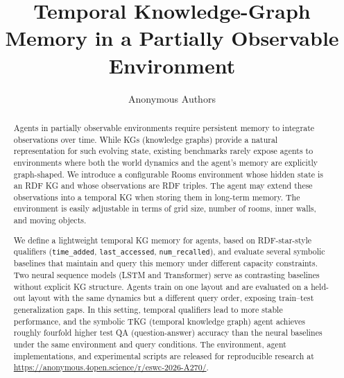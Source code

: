 \documentclass[runningheads]{llncs}
\begin{document}
%
\title{Temporal Knowledge-Graph Memory in a Partially Observable Environment}

%
%
\author{Anonymous Authors}

\maketitle              %
%

\begin{abstract}
Agents in partially observable environments require persistent memory to integrate observations over time. While KGs (knowledge graphs) provide a natural representation for such evolving state, existing benchmarks rarely
expose agents to environments where both the world dynamics and the
agent’s memory are explicitly graph-shaped. We introduce a configurable Rooms environment whose hidden state is an RDF KG and whose observations are RDF triples.
The agent may extend these observations into a temporal KG when storing
them in long-term memory. The environment is easily adjustable in terms of grid
size, number of rooms, inner walls, and moving objects.

We define a lightweight temporal KG memory for agents, based on
RDF-star-style qualifiers (\texttt{time\_added},
\texttt{last\_accessed}, \texttt{num\_recalled}), and evaluate several
symbolic baselines that maintain and query this memory under different
capacity constraints. Two neural sequence models (LSTM and Transformer) serve as contrasting baselines without explicit KG structure. Agents train on one layout and are evaluated on a held-out layout with the same dynamics but a different query order, exposing train–test generalization gaps. In this setting, temporal qualifiers lead to more
stable performance, and the symbolic TKG (temporal knowledge graph) agent achieves roughly fourfold higher test QA (question-answer) accuracy than the neural baselines under the same environment and query conditions. The environment, agent implementations, and
experimental scripts are released for reproducible research at
\url{https://anonymous.4open.science/r/eswc-2026-A270/}.

\end{abstract}
\end{document}
